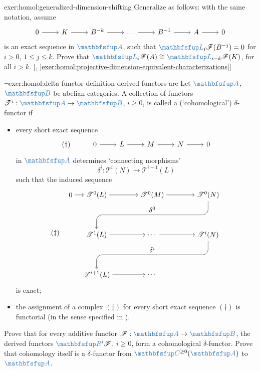 \begin{exer}{\exerused{}}{exer:homol:generalized-dimension-shifting}
  Generalize
   as
  follows: with the same notation, assume
  \[\begin{tikzcd}
      0 \arrow[r] & K \arrow[r] & B^{-k} \arrow[r] & \dots \arrow[r] &
      B^{-1} \arrow[r] & A \arrow[r] & 0
    \end{tikzcd}\] is an exact sequence in $\categ{A}$, such that
  $\categ{L}_i\mathscr{F}(B^{-j}) = 0$ for $i > 0$, $1 \le j \le k$.
  Prove that
  $\categ{L}_i\mathscr{F}(A) \cong \categ{L}_{i-k}\mathscr{F}(K)$, for
  all $i > k$. [,
  \ref{exer:homol:projective-dimension-equivalent-characterizations}]
\end{exer}
\begin{exer}{$\lnot$}{exer:homol:delta-functor-definition-derived-functors-are}
  Let $\categ{A}$, $\categ{B}$ be abelian categories. A collection of
  functors $\mathscr{T}^i : \categ{A} \to \categ{B}$, $i \ge 0$, is
  called a (`cohomological') $\delta$-functor if
  \begin{itemize}
  \item every short exact sequence
    \[\begin{tikzcd}
        (\dagger) & 0 \arrow[r] & L \arrow[r] & M \arrow[r] & N
        \arrow[r] & 0
      \end{tikzcd}\] in $\categ{A}$ determines `connecting morphisms'
    \[
      \delta^i : \mathscr{T}^i(N) \to \mathscr{T}^{i+1}(L)
    \]
    such that the induced sequence
    \[
      (\ddagger) \quad
      \begin{tikzpicture}[baseline=(current bounding box.center)]
        \node (zero) at (-1.3,4)
        {$0$}; \node (T0L) at (0,4)
        {$\mathscr{T}^0(L)$}; \node (T0M) at (2.8,4)
        {$\mathscr{T}^0(M)$}; \node (T0N) at (5.6,4)
        {$\mathscr{T}^0(N)$}; \node (T1L) at (0,2)
        {$\mathscr{T}^1(L)$}; \node (dots1) at (2.8,2)
        {$\dots$}; \node (TiN) at (5.6,2)
        {$\mathscr{T}^i(N)$}; \node (Ti1L) at (0,0)
        {$\mathscr{T}^{i+1}(L)$}; \node (dots2) at (2.8,0)
        {$\dots$}; \draw[->] (zero) -- (T0L); \draw[->] (T0L) --
        (T0M); \draw[->] (T0M) -- (T0N); \draw[->] (T1L) -- (dots1);
        \draw[->] (dots1) -- (TiN); \draw[->] (Ti1L) -- (dots2);
        \draw[->, rounded corners=8pt] (T0N.south) -- (5.6,3) --
        node[above]
        {$\delta^0$} (0,3) -- (T1L.north); \draw[->, rounded
        corners=8pt] (TiN.south) -- (5.6,1) -- node[above]
        {$\delta^i$} (0,1) -- (Ti1L.north);
      \end{tikzpicture}
    \]
    is exact;
  \item the assignment of a complex $(\ddagger)$ for every short exact
    sequence $(\dagger)$ is functorial (in the sense specified in
    ).
  \end{itemize}
  Prove that for every additive functor
  $\mathscr{F} : \categ{A} \to \categ{B}$, the derived functors
  $\categ{R}^i\mathscr{F}$, $i \ge 0$, form a cohomological
  $\delta$-functor. Prove that cohomology itself is a $\delta$-functor
  from $\categ{C}^{\ge 0}(\categ{A})$ to $\categ{A}$.


\end{exer}
